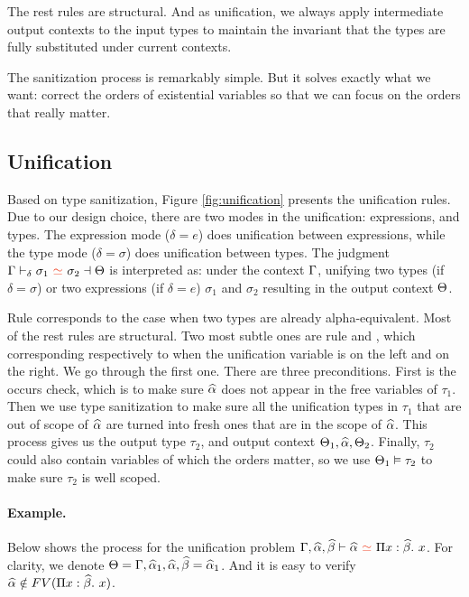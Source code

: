 The rest rules are structural.
And as unification, we always apply intermediate output
contexts to the input types to maintain the invariant that the types are fully
substituted under current contexts.

The sanitization process is remarkably simple. But it solves exactly what we
want: correct the orders of existential variables so that we can focus on the
orders that really matter.

\subsection{Unification}

Based on type sanitization, Figure \ref{fig:unification} presents the
unification rules. Due to our design choice, there are two modes in the
unification: expressions, and types. The expression mode ($\delta = e$) does
unification between expressions, while the type mode ($\delta = \sigma$) does
unification between types. The judgment $\tctx \bybuni \sigma_1 \uni \sigma_2
\toctx$ is interpreted as: under the context $\Gamma$, unifying two types (if
$\delta = \sigma$) or two expressions (if $\delta = e$) $\sigma_1$ and
$\sigma_2$ resulting in the output context $\Theta$.

Rule  corresponds to the case when two types are already
alpha-equivalent. Most of the rest rules are structural.
Two most subtle ones are rule  and , which
corresponding respectively to when the unification variable is on the left and on the
right. We go through the first one. There are three preconditions.
First is the occurs check, which is to make sure $\widehat{\alpha}$ does not appear in the
free variables of $\tau_1$.
Then we use type sanitization to make sure all the
unification types in $\tau_1$ that are out of scope of $\widehat{\alpha}$ are turned into
fresh ones that are in the scope of $\widehat{\alpha}$. This process gives us the output
type $\tau_2$, and output context $\Theta_1, \widehat{\alpha}, \Theta_2$.
Finally, $\tau_2$ could also contain
variables of which the
orders matter, so
we use $\Theta_1 \vDash \tau_2$ to make sure $\tau_2$ is well scoped.

\paragraph{Example.} Below shows the process for the unification problem
$\tctx, \genA, \genB \byuni \genA \uni \bpi x \genB x$.
For clarity, we denote $\Theta = \Gamma,\widehat{\alpha}_1,\widehat{\alpha},\widehat{\beta} =\widehat{\alpha}_1$. And it is
easy to verify  $\widehat{\alpha} \notin FV(\Pi x:\widehat{\beta}.~ x)$.

